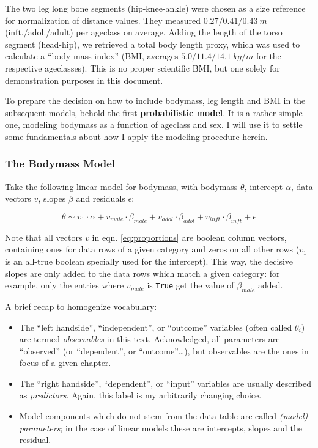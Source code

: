 The two leg long bone segments (hip-knee-ankle) were chosen as a size reference for normalization of distance values. They measured \(0.27/0.41/0.43\ m\) (inft./adol./adult) per ageclass on average.
Adding the length of the torso segment (head-hip), we retrieved a total body length proxy, which was used to calculate a ``body mass index'' (BMI, averages \(5.0/11.4/14.1\ kg/m\) for the respective ageclasses).
This is no proper scientific BMI, but one solely for demonstration purposes in this document.
\medskip

To prepare the decision on how to include bodymass, leg length and BMI in the subsequent models, behold the first \textbf{probabilistic model}.
It is a rather simple one, modeling bodymass as a function of ageclass and sex.
I will use it to settle some fundamentals about how I apply the modeling procedure herein.

\subsubsection{The Bodymass Model}
\label{sec:orge4d1e9b}
Take the following linear model for bodymass, with bodymass \(\theta\), intercept \(\alpha\), data vectors \(v\), slopes \(\beta\) and residuals \(\epsilon\):

\begin{equation} \theta \sim v_{1}\cdot\alpha + v_{male}\cdot\beta_{male} + v_{adol}\cdot\beta_{adol} + v_{inft}\cdot\beta_{inft} + \epsilon \label{eq:proportions} \end{equation}

Note that all vectors \(v\) in eqn. \eqref{eq:proportions} are boolean column vectors, containing ones for data rows of a given category and zeros on all other rows (\(v_{1}\) is an all-true boolean specially used for the intercept).
This way, the decisive slopes are only added to the data rows which match a given category: for example, only the entries where \(v_{male}\) is \texttt{True} get the value of \(\beta_{male}\) added.

A brief recap to homogenize vocabulary:
\begin{itemize}
\item The ``left handside'', ``independent'', or ``outcome'' variables (often called \(\theta_{i}\)) are termed \emph{observables} in this text. Acknowledged, all parameters are ``observed'' (or ``dependent'', or ``outcome''\ldots{}), but observables are the ones in focus of a given chapter.
\item The ``right handside'', ``dependent'', or ``input'' variables are usually described as \emph{predictors}. Again, this label is my arbitrarily changing choice.
\item Model components which do not stem from the data table are called \emph{(model) parameters}; in the case of linear models these are intercepts, slopes and the residual.
\end{itemize}

